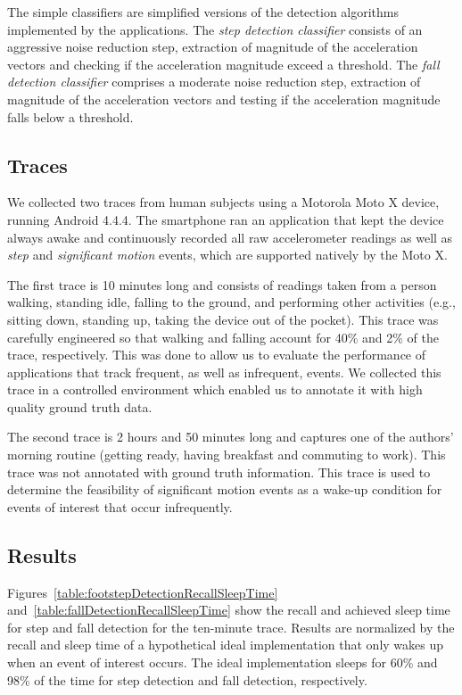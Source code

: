 The simple classifiers are simplified versions of the detection algorithms implemented
by the applications.  The {\em step detection classifier} consists of an aggressive noise 
reduction step, extraction of magnitude of the acceleration vectors and checking if the 
acceleration magnitude exceed a threshold. The {\em fall detection classifier} comprises a 
moderate noise reduction step, extraction of magnitude of the acceleration vectors and testing
if the acceleration magnitude falls below a threshold.

\subsection{Traces}

We collected two traces from human subjects using a Motorola Moto X
device, running Android 4.4.4.  The smartphone ran an application that
kept the device always awake and continuously recorded all raw
accelerometer readings as well as {\em step} and {\em significant motion} 
events, which are supported natively by the Moto X.

The first trace is 10 minutes long and consists of readings taken from
a person walking, standing idle, falling to the ground, and performing
other activities (e.g., sitting down, standing up, taking the device
out of the pocket).  This trace was carefully engineered so that
walking and falling account for 40\% and 2\% of the trace,
respectively.  This was done to allow us to evaluate the performance
of applications that track frequent, as well as infrequent, events.  We
collected this trace in a controlled environment which enabled us to
annotate it with high quality ground truth data.

The second trace is 2 hours and 50 minutes long and captures one of
the authors' morning routine (getting ready, having breakfast and
commuting to work).  This trace was not annotated with ground truth
information.  This trace is used to determine the feasibility of 
significant motion events as a wake-up condition for events of
interest that occur infrequently.

\subsection{Results}

Figures~\ref{table:footstepDetectionRecallSleepTime}
and~\ref{table:fallDetectionRecallSleepTime} show the recall and
achieved sleep time for step and fall detection for the ten-minute
trace.  Results are normalized by the recall and sleep time of a
hypothetical ideal implementation that only wakes up when an event of
interest occurs.  The ideal implementation sleeps for 60\% and 98\% of
the time for step detection and fall detection, respectively.

